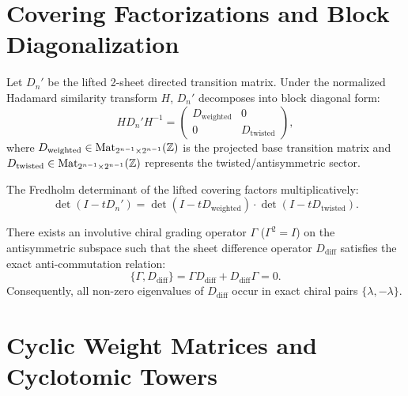 \section{Covering Factorizations and Block Diagonalization}

\begin{theorem}
\label{thm:collatz_dir_block_diag}
\leanok
Let $D_n'$ be the lifted 2-sheet directed transition matrix. Under the normalized Hadamard similarity transform $H$, $D_n'$ decomposes into block diagonal form:
\[
H D_n' H^{-1} = \begin{pmatrix} D_{\mathrm{weighted}} & 0 \\ 0 & D_{\mathrm{twisted}} \end{pmatrix},
\]
where $D_{\mathrm{weighted}} \in \mathrm{Mat}_{2^{n-1} \times 2^{n-1}}(\mathbb{Z})$ is the projected base transition matrix and $D_{\mathrm{twisted}} \in \mathrm{Mat}_{2^{n-1} \times 2^{n-1}}(\mathbb{Z})$ represents the twisted/antisymmetric sector.
\end{theorem}

\begin{theorem}
\label{thm:covering_det_factorization}
\leanok
The Fredholm determinant of the lifted covering factors multiplicatively:
\[
\det(I - t D_n') = \det(I - t D_{\mathrm{weighted}}) \cdot \det(I - t D_{\mathrm{twisted}}).
\]
\end{theorem}

\begin{theorem}
\label{thm:chiral_decomposition}
\leanok
There exists an involutive chiral grading operator $\Gamma$ ($\Gamma^2 = I$) on the antisymmetric subspace such that the sheet difference operator $D_{\mathrm{diff}}$ satisfies the exact anti-commutation relation:
\[
\{ \Gamma, D_{\mathrm{diff}} \} = \Gamma D_{\mathrm{diff}} + D_{\mathrm{diff}} \Gamma = 0.
\]
Consequently, all non-zero eigenvalues of $D_{\mathrm{diff}}$ occur in exact chiral pairs $\{\lambda, -\lambda\}$.
\end{theorem}

\section{Cyclic Weight Matrices and Cyclotomic Towers}

